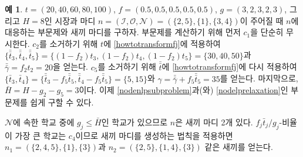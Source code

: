 \documentclass[11pt]{article} %
\newif\ifen
\theoremstyle{definition}
\newtheorem{example}{Example}
\theoremstyle{definition}
\newtheorem{example}{예}
\begin{document}
\begin{example}
\ifen
Consider a market in which $t = (20, 40, 60, 80, 100)$, $f = (0.5, 0.5, 0.5, 0.5, 0.5)$, $g = (3, 2, 3, 2, 3)$, and $H = 8$, and the node $n =  (\mathcal{I}, \mathcal{O}, \mathcal{N}) = (\{2, 5\}, \{1\}, \{3, 4\})$. Let us compute the two subproblems associated with $n$ and identify its children. To compute the subproblems, we first simply disregard $c_1$. Next, to eliminate $c_2$, we apply \eqref{howtotransformfj} to $t$ to obtain
$\{\bar{\bar t}_3, \bar{\bar t}_4, \bar{\bar t}_5\} = \{ (1 - f_2) t_3, (1 - f_2) t_4, (1 -f_2) t_5\} = \{30, 40, 50 \}$ and $\bar{\bar \gamma} = f_2 t_2 = 20$. We eliminate $c_5$ by again applying \eqref{howtotransformfj} to $\bar{ \bar t}$ to obtain $\{\bar t_3, \bar t_4\} =  \{\bar{\bar t}_3 - f_5 \bar{\bar t}_5, \bar{\bar t}_4-  f_5 \bar{\bar t}_5\}= \{5, 15\}$ and $\gamma = \bar{\bar \gamma} + f_5 \bar{\bar t}_5 = 35$. Finally, $\bar H = H - g_2 - g_5 = 3$. Now problems \eqref{nodenlpsubproblem} and \eqref{nodelprelaxation} are easily obtained by substitution.
\else
 $t = (20, 40, 60, 80, 100)$, $f = (0.5, 0.5, 0.5, 0.5, 0.5)$, $g = (3, 2, 3, 2, 3)$, 그리고 $H = 8$인 시장과 마디 $n =  (\mathcal{I}, \mathcal{O}, \mathcal{N}) = (\{2, 5\}, \{1\}, \{3, 4\})$이 주어질 때 $n$에 대응하는 부문제와 새끼 마디를 구하자. 부문제를 계산하기 위해 먼저 $c_1$을 단순히 무시한다.  $c_2$를 소거하기 위해 $t$에 \eqref{howtotransformfj}에 적용하여 
$\{\bar{\bar t}_3, \bar{\bar t}_4, \bar{\bar t}_5\} = \{ (1 - f_2) t_3, (1 - f_2) t_4, (1 -f_2) t_5\} = \{30, 40, 50 \}$과 $\bar{\bar \gamma} = f_2 t_2 = 20$을 얻는다. $c_5$를 소거하기 위해 $\bar{\bar t}$에 \eqref{howtotransformfj}에 다시 적용하여 $\{\bar t_3, \bar t_4\} =  \{\bar{\bar t}_3 - f_5 \bar{\bar t}_5, \bar{\bar t}_4-  f_5 \bar{\bar t}_5\}= \{5, 15\}$와 $\gamma = \bar{\bar \gamma} + f_5 \bar{\bar t}_5 = 35$를 얻는다. 마지막으로, $\bar H = H - g_2 - g_5 = 3$이다. 이제 \eqref{nodenlpsubproblem}과(와) \eqref{nodelprelaxation}인 부문제를 쉽게 구할 수 있다.
\fi

\ifen
Since at least one of the schools in $\mathcal{N}$ has $g_j \leq \bar H$, $n$ has two children. Applying the node-generation rule, $c_4$ has the highest $f_j \bar t_j / g_j$-ratio, so the children are $n_1 = (\{2, 4, 5\}, \{1\}, \{3\})$ and $n_2 = (\{2, 5\}, \{1, 4\}, \{3\})$.
\else
$\mathcal{N}$에 속한 학교 중에 $g_j \leq \bar H$인 학교가 있으므로 $n$은 새끼 마디 2개 있다. $f_j \bar t_j / g_j$-비율이 가장 큰 학교는 $c_4$이므로 새끼 마디를 생성하는 법칙을 적용하면 $n_1 = (\{2, 4, 5\}, \{1\}, \{3\})$과 $n_2 = (\{2, 5\}, \{1, 4\}, \{3\})$ 같은 새끼를 얻는다.
\fi
\end{example}
\end{document}
